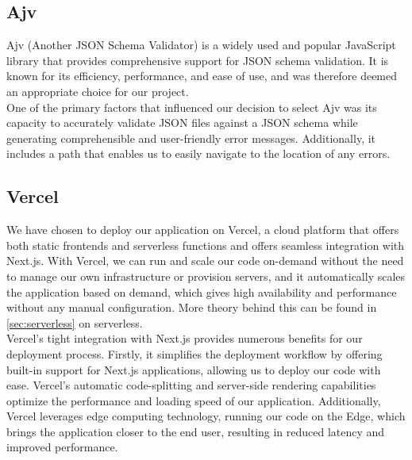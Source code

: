 \subsection{Ajv}

Ajv (Another JSON Schema Validator) is a widely used and popular JavaScript library that provides comprehensive support for JSON schema validation. It is known for its efficiency, performance, and ease of use, and was therefore deemed an appropriate choice for our project. \cite{ajv_general} \\

\noindent
One of the primary factors that influenced our decision to select Ajv was its capacity to accurately validate JSON files against a JSON schema while generating comprehensible and user-friendly error messages. Additionally, it includes a path that enables us to easily navigate to the location of any errors.

\subsection{Vercel}


We have chosen to deploy our application on Vercel, a cloud platform that offers both static frontends and serverless functions and offers seamless integration with Next.js. \cite{vercel_serverless} With Vercel, we can run and scale our code on-demand without the need to manage our own infrastructure or provision servers, and it automatically scales the application based on demand, which gives high availability and performance without any manual configuration. More theory behind this can be found in \autoref{sec:serverless} on serverless. \\ 

\noindent
Vercel's tight integration with Next.js provides numerous benefits for our deployment process. Firstly, it simplifies the deployment workflow by offering built-in support for Next.js applications, allowing us to deploy our code with ease. Vercel's automatic code-splitting and server-side rendering capabilities optimize the performance and loading speed of our application. Additionally, Vercel leverages edge computing technology, running our code on the Edge, which brings the application closer to the end user, resulting in reduced latency and improved performance. \cite{vercel_edge_network} \\

